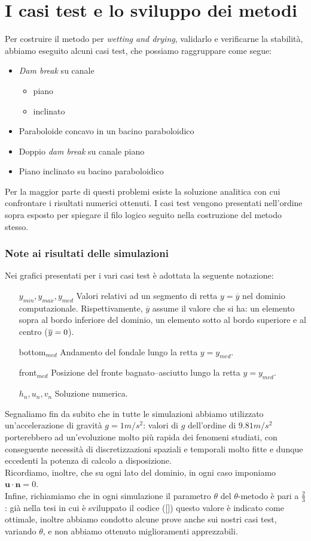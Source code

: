 \documentclass[a4paper,12pt,oneside]{book}
\theoremstyle{definition}
\begin{document}
\chapter{I casi test  e lo sviluppo dei metodi} \label{Cap:CasiTest}
Per costruire il metodo per \emph{wetting and drying}, validarlo e verificarne la stabilit\`a, abbiamo eseguito alcuni casi test, che possiamo raggruppare come segue:
\begin{itemize}
\item \emph{Dam break} su canale
	\begin{itemize}
	\item piano
	\item inclinato
	\end{itemize}
\item Paraboloide concavo in un bacino paraboloidico 
\item Doppio \emph{dam break} su canale piano
\item Piano inclinato su bacino paraboloidico
\end{itemize}
Per la maggior parte di questi problemi esiste la soluzione analitica con cui confrontare i risultati numerici ottenuti. I casi test vengono presentati nell'ordine sopra esposto per spiegare il filo logico seguito nella costruzione del metodo stesso.

\subsection{Note ai risultati delle simulazioni}	
Nei grafici presentati per i vari casi test \`e adottata la seguente notazione:
\begin{itemize}
	\item[$y_{min}, y_{max}, y_{med}$] Valori relativi ad un segmento di retta $y=\overline{y}$ nel dominio computazionale. Rispettivamente, $\overline{y}$ assume il valore che si ha: un elemento sopra al bordo inferiore del dominio, un elemento sotto al bordo superiore e al centro ($\overline{y}=\nolinebreak0$).
	\item[bottom$_{med}$] Andamento del fondale lungo la retta $y=y_{med}$.
	\item[front$_{med}$] Posizione del fronte bagnato--asciutto lungo la retta $y=y_{med}$.
	\item[$h_n, u_n, v_n$] Soluzione numerica.
\end{itemize}
Segnaliamo fin da subito che in tutte le simulazioni abbiamo utilizzato un'accelerazione di gravit\`a $g=1m/s^2$: valori di $g$ dell'ordine di $9.81m/s^2$ porterebbero ad un'evoluzione molto pi\`u rapida dei fenomeni studiati, con conseguente necessit\`a di discretizzazioni spaziali e temporali molto fitte e dunque eccedenti la potenza di calcolo a disposizione.\\
Ricordiamo, inoltre, che su ogni lato del dominio, in ogni caso imponiamo $\mathbf{u}\cdot\mathbf{n}=0$.\\
Infine, richiamiamo che in ogni simulazione il parametro $\theta$ del $\theta$-metodo \`e pari a $\frac{2}{3}$: gi\`a nella tesi in cui \`e sviluppato il codice ([\cite{Porta2010a}]) questo valore \`e indicato come ottimale, inoltre abbiamo condotto alcune prove anche sui nostri casi test, variando $\theta$, e non abbiamo ottenuto miglioramenti apprezzabili.
\end{document}
